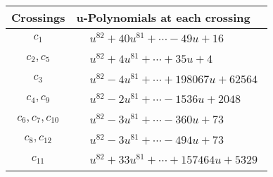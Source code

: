 \documentclass[1p]{elsarticle_modified}
\theoremstyle{definition}
\begin{document}
\begin{tabular}{m{50pt}|m{274pt}}
Crossings & \hspace{64pt}u-Polynomials at each crossing \\
\hline $$\begin{aligned}c_{1}\end{aligned}$$&$\begin{aligned}
&u^{82}+40 u^{81}+\cdots-49 u+16
\end{aligned}$\\
\hline $$\begin{aligned}c_{2},c_{5}\end{aligned}$$&$\begin{aligned}
&u^{82}+4 u^{81}+\cdots+35 u+4
\end{aligned}$\\
\hline $$\begin{aligned}c_{3}\end{aligned}$$&$\begin{aligned}
&u^{82}-4 u^{81}+\cdots+198067 u+62564
\end{aligned}$\\
\hline $$\begin{aligned}c_{4},c_{9}\end{aligned}$$&$\begin{aligned}
&u^{82}-2 u^{81}+\cdots-1536 u+2048
\end{aligned}$\\
\hline $$\begin{aligned}c_{6},c_{7},c_{10}\end{aligned}$$&$\begin{aligned}
&u^{82}-3 u^{81}+\cdots-360 u+73
\end{aligned}$\\
\hline $$\begin{aligned}c_{8},c_{12}\end{aligned}$$&$\begin{aligned}
&u^{82}-3 u^{81}+\cdots-494 u+73
\end{aligned}$\\
\hline $$\begin{aligned}c_{11}\end{aligned}$$&$\begin{aligned}
&u^{82}+33 u^{81}+\cdots+157464 u+5329
\end{aligned}$\\
\hline
\end{tabular}\\~\\
\newpage\renewcommand{\arraystretch}{1}
\end{document}

